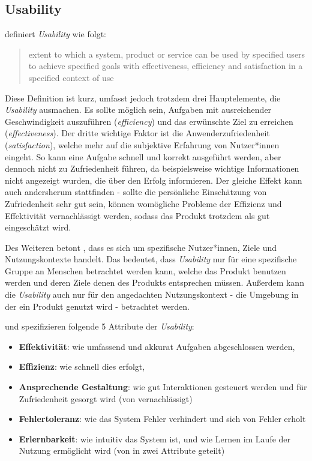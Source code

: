 \subsection{Usability}
 definiert \textit{Usability} wie folgt:
\begin{quote}
  extent to which a system, product or service can be used by specified users to achieve specified goals with effectiveness, efficiency and satisfaction in a specified context of use
  \hspace*{\fill{}}\cite{ISO924111}
\end{quote}

Diese Definition ist kurz, umfasst jedoch trotzdem drei Hauptelemente, die \textit{Usability} ausmachen. Es sollte möglich sein, Aufgaben mit ausreichender Geschwindigkeit auszuführen (\textit{efficiency}) und das erwünschte Ziel zu erreichen (\textit{effectiveness}). Der dritte wichtige Faktor ist die Anwenderzufriedenheit (\textit{satisfaction}), welche mehr auf die subjektive Erfahrung von Nutzer*innen eingeht. So kann eine Aufgabe schnell und korrekt ausgeführt werden, aber dennoch nicht zu Zufriedenheit führen, da beispielsweise wichtige Informationen nicht angezeigt wurden, die über den Erfolg informieren. Der gleiche Effekt kann auch andersherum stattfinden - sollte die persönliche Einschätzung von Zufriedenheit sehr gut sein, können womögliche Probleme der Effizienz und Effektivität vernachlässigt werden, sodass das Produkt trotzdem als gut eingeschätzt wird. \cite{barnumUsabilityTesting2021}

Des Weiteren betont \citeauthor{barnumUsabilityTesting2021} \cite{barnumUsabilityTesting2021}, dass es sich um spezifische Nutzer*innen, Ziele und Nutzungskontexte handelt. Das bedeutet, dass \textit{Usability} nur für eine spezifische Gruppe an Menschen betrachtet werden kann, welche das Produkt benutzen werden und deren Ziele denen des Produkts entsprechen müssen. Außerdem kann die \textit{Usability} auch nur für den angedachten Nutzungskontext - die Umgebung in der ein Produkt genutzt wird - betrachtet werden.

\citeauthor{quesenberyDimensionsUsability2003} \cite{quesenberyDimensionsUsability2003} und \citeauthor{nielsenUsabilityEngineering1994} \cite{nielsenUsabilityEngineering1994} spezifizieren folgende 5 Attribute der \textit{Usability}:
\begin{itemize}
  \item \textbf{Effektivität}: wie umfassend und akkurat Aufgaben abgeschlossen werden,
  \item \textbf{Effizienz}: wie schnell dies erfolgt,
  \item \textbf{Ansprechende Gestaltung}: wie gut Interaktionen gesteuert werden und für Zufriedenheit gesorgt wird (von \citeauthor{nielsenUsabilityEngineering1994} vernachlässigt)
  \item \textbf{Fehlertoleranz}: wie das System Fehler verhindert und sich von Fehler erholt
  \item \textbf{Erlernbarkeit}: wie intuitiv das System ist, und wie Lernen im Laufe der Nutzung ermöglicht wird (von \citeauthor{nielsenUsabilityEngineering1994} in zwei Attribute geteilt)
\end{itemize}

